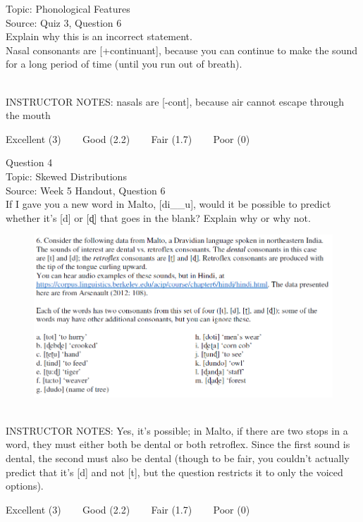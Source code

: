 \documentclass[12pt]{article}
\begin{document}
Topic: Phonological Features\\
Source: Quiz 3, Question 6\\

Explain why this is an incorrect statement.\\

Nasal consonants are {[+continuant]}, because you can continue to make the sound for a long period of time (until you run out of breath).


~\\
INSTRUCTOR NOTES: nasals are [-cont], because air cannot escape through the mouth


\vfill
Excellent (3) ~~~ Good (2.2) ~~~ Fair (1.7) ~~~ Poor (0)
\newpage

{\large Question 4}\\

Topic: Skewed Distributions\\
Source: Week 5 Handout, Question 6\\

If I gave you a new word in Malto, [di\_\_u], would it be possible to predict whether it's [d] or [ɖ] that goes in the blank? Explain why or why not.\\

\begin{figure}[H]
\includegraphics{../images/malto.png}
\end{figure}

~\\
INSTRUCTOR NOTES: Yes, it's possible; in Malto, if there are two stops in a word, they must either both be dental or both retroflex. Since the first sound is dental, the second must also be dental (though to be fair, you couldn't actually predict that it's [d] and not [t], but the question restricts it to only the voiced options).


\vfill
Excellent (3) ~~~ Good (2.2) ~~~ Fair (1.7) ~~~ Poor (0)
\newpage
\end{document}
